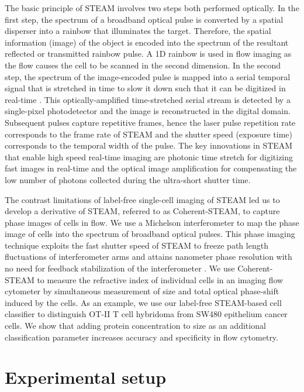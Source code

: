 The basic principle of STEAM involves two steps both performed optically. In the first step, the spectrum of a broadband optical pulse is converted by a spatial disperser into a rainbow that illuminates the target. Therefore, the spatial information (image) of the object is encoded into the spectrum of the resultant reflected or transmitted rainbow pulse. A 1D rainbow is used in flow imaging as the flow causes the cell to be scanned in the second dimension. In the second step, the spectrum of the image-encoded pulse is mapped into a serial temporal signal that is stretched in time to slow it down such that it can be digitized in real-time \cite{goda2013dispersive}. This optically-amplified time-stretched serial stream is detected by a single-pixel photodetector and the image is reconstructed in the digital domain. Subsequent pulses capture repetitive frames, hence the laser pulse repetition rate corresponds to the frame rate of STEAM and the shutter speed (exposure time) corresponds to the temporal width of the pulse. The key innovations in STEAM that enable high speed real-time imaging are photonic time stretch for digitizing fast images in real-time and the optical image amplification for compensating the low number of photons collected during the ultra-short shutter time.

The contrast limitations of label-free single-cell imaging of STEAM led us to develop a derivative of STEAM, referred to as Coherent-STEAM, to capture phase images of cells in flow. We use a Michelson interferometer to map the phase image of cells into the spectrum of broadband optical pulses. This phase imaging technique exploits the fast shutter speed of STEAM to freeze path length fluctuations of interferometer arms and attains nanometer phase resolution with no need for feedback stabilization of the interferometer \cite{mahjoubfar2011high,goda2012hybrid,mahjoubfar20133d}. We use Coherent-STEAM to measure the refractive index of individual cells in an imaging flow cytometer by simultaneous measurement of size and total optical phase-shift induced by the cells. As an example, we use our label-free STEAM-based cell classifier to distinguish OT-II T cell hybridoma from SW480 epithelium cancer cells. We show that adding protein concentration to size as an additional classification parameter increases accuracy and specificity in flow cytometry.

\section{Experimental setup}

